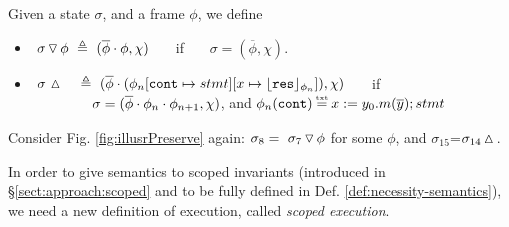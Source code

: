  
 
 
 
\begin{definition}
\label{def:push:frame}
Given a state $\sigma$, and a frame $\phi$,  we define
\begin{itemize}
\item
 $  \ {\sigma} \, {\triangledown}\, {\phi}  \ \triangleq \ ({\overline{\phi}\cdot\phi}, \chi)$ \ \ \  if \ \ \  $\sigma=(\overline{\phi}, \chi)$.
\item
$ \ \sigma\, \popSymbol \ \ \  \triangleq\   { (\overline{\phi}\cdot (\phi_n[\prg{cont}\mapsto stmt][x \mapsto \interpret {\phi_n}{\prg{res}}]), \chi)}$ \ \ \  if \\
 $\strut \hspace{1.5cm} \sigma=(\overline{\phi}\cdot\phi_n\cdot\phi_{n+1}, \chi)$, and $\phi_n(\prg{cont})\txteq x:= y_0.m(\overline y); stmt $
\end{itemize}
 \end{definition}

 \noindent Consider Fig. \ref{fig:illusrPreserve}  again: $\sigma_8 =  \ {\sigma_7} \, {\triangledown}\, {\phi} $ for some $\phi$, {and}  $\sigma_{15}$=$\sigma_{14} \, {\vartriangle}\,$.

 
 \label{sect:bounded}


In order to give semantics to scoped invariants (introduced in \S  \ref{sect:approach:scoped} and to be fully defined  in Def.  \ref{def:necessity-semantics}), we need a new definition of execution, called \emph{scoped execution}. 

